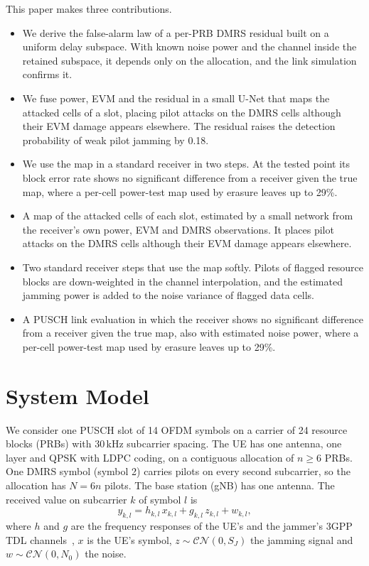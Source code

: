 \documentclass[conference]{IEEEtran}
\begin{document}
This paper makes three contributions.
\begin{itemize}
\ifstoryC
\item {\color{Conly}We derive the false-alarm law of a per-PRB DMRS residual built on a uniform
  delay subspace. With known noise power and the channel inside the retained subspace, it depends
  only on the allocation, and the link simulation confirms it.}
\item We fuse power, EVM and the residual in a small U-Net that maps the attacked cells of a slot,
  placing pilot attacks on the DMRS cells although their EVM damage appears elsewhere. The residual
  raises the detection probability of weak pilot jamming by 0.18.
\item We use the map in a standard receiver in two steps. At the tested point its block error rate
  shows no significant difference from a receiver given the true map, where a per-cell
  power-test map used by erasure leaves up to 29\%.
\else
\item A map of the attacked cells of each slot, estimated by a small network from the receiver's
  own power, EVM and DMRS observations. It places pilot attacks on the DMRS cells although their
  EVM damage appears elsewhere.
\item Two standard receiver steps that use the map softly. Pilots of flagged resource blocks are
  down-weighted in the channel interpolation, and the estimated jamming power is added to the
  noise variance of flagged data cells.
\item A PUSCH link evaluation in which the receiver shows no significant difference from a
  receiver given the true map, also with estimated noise power, where a per-cell power-test map
  used by erasure leaves up to 29\%.
\fi
\end{itemize}

\section{System Model}

We consider one PUSCH slot of 14 OFDM symbols on a carrier of 24 resource blocks (PRBs) with
30\,kHz subcarrier spacing. The UE has one antenna, one layer and QPSK with LDPC coding, on a
contiguous allocation of $n \ge 6$ PRBs. One DMRS symbol (symbol 2) carries pilots on every second
subcarrier, so the allocation has $N = 6n$ pilots. The base station (gNB) has one antenna. The
received value on subcarrier $k$ of symbol $l$ is
\begin{equation}
  y_{k,l} = h_{k,l}\, x_{k,l} + g_{k,l}\, z_{k,l} + w_{k,l},
  \label{eq:model}
\end{equation}
where $h$ and $g$ are the frequency responses of the UE's and the jammer's 3GPP TDL
channels~\cite{3gpp38901}, $x$ is the UE's symbol, $z \sim \mathcal{CN}(0, S_J)$ the jamming
signal and $w \sim \mathcal{CN}(0, N_0)$ the noise.
\end{document}
